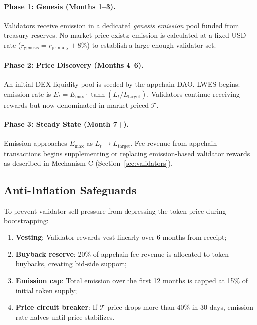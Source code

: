 \documentclass[11pt]{article}
\begin{document}
\paragraph{Phase 1: Genesis (Months 1--3).}
Validators receive emission in a dedicated \emph{genesis emission} pool funded from
treasury reserves. No market price exists; emission is calculated at a fixed USD
rate ($r_{\text{genesis}} = r_{\text{primary}} + 8\%$) to establish a large-enough
validator set.

\paragraph{Phase 2: Price Discovery (Months 4--6).}
An initial DEX liquidity pool is seeded by the appchain DAO. LWES begins: emission rate
is $E_t = E_{\max} \cdot \tanh(L_t / L_{\text{target}})$. Validators continue receiving
rewards but now denominated in market-priced $\mathcal{T}$.

\paragraph{Phase 3: Steady State (Month 7+).}
Emission approaches $E_{\max}$ as $L_t \to L_{\text{target}}$. Fee revenue from appchain
transactions begins supplementing or replacing emission-based validator rewards as
described in Mechanism C (Section~\ref{sec:validators}).

\subsection{Anti-Inflation Safeguards}

To prevent validator sell pressure from depressing the token price during bootstrapping:

\begin{enumerate}[leftmargin=1.5em]
  \item \textbf{Vesting}: Validator rewards vest linearly over 6 months from receipt;
  \item \textbf{Buyback reserve}: 20\% of appchain fee revenue is allocated to token buybacks,
    creating bid-side support;
  \item \textbf{Emission cap}: Total emission over the first 12 months is capped at 15\%
    of initial token supply;
  \item \textbf{Price circuit breaker}: If $\mathcal{T}$ price drops more than 40\% in 30
    days, emission rate halves until price stabilizes.
\end{enumerate}
\end{document}
